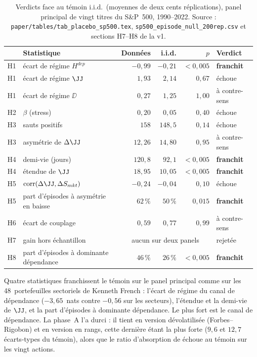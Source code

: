 \begin{table}[htbp]
\centering
\small
\begin{tabular}{@{}llrrrl@{}}
\toprule
& Statistique & Données & i.i.d. & $p$ & Verdict \\
\midrule
H1 & écart de régime $H^{dep}$ & $-0{,}99$ & $-0{,}21$ & $<0{,}005$ & \textbf{franchit} \\
H1 & écart de régime $\JJ$ & $1{,}93$ & $2{,}14$ & $0{,}67$ & échoue \\
H1 & écart de régime $\DD$ & $0{,}27$ & $1{,}25$ & $1{,}00$ & à contre-sens \\
H2 & $\beta$ (stress) & $0{,}20$ & $0{,}05$ & $0{,}40$ & échoue \\
H3 & sauts positifs & $158$ & $148{,}5$ & $0{,}14$ & échoue \\
H3 & asymétrie de $\Delta\JJ$ & $12{,}26$ & $14{,}80$ & $0{,}95$ & à contre-sens \\
H4 & demi-vie (jours) & $120{,}8$ & $92{,}1$ & $<0{,}005$ & \textbf{franchit} \\
H4 & étendue de $\JJ$ & $18{,}95$ & $10{,}05$ & $<0{,}005$ & \textbf{franchit} \\
H5 & $\mathrm{corr}(\Delta\JJ,\Delta S_{mkt})$ & $-0{,}24$ & $-0{,}04$ & $0{,}10$ & échoue \\
H5 & part d'épisodes à asymétrie en baisse & $62\,\%$ & $50\,\%$ & $0{,}015$ & \textbf{franchit} \\
H6 & écart de couplage & $0{,}59$ & $0{,}77$ & $0{,}99$ & à contre-sens \\
H7 & gain hors échantillon & \multicolumn{3}{c}{aucun sur deux panels} & rejetée \\
H8 & part d'épisodes à dominante dépendance & $46\,\%$ & $26\,\%$ & $<0{,}005$ & \textbf{franchit} \\
\bottomrule
\end{tabular}
\caption{Verdicts face au témoin i.i.d.\ (moyennes de deux cents réplications),
panel principal de vingt titres du S\&P~500, 1990--2022. Source :
\texttt{paper/tables/tab\_placebo\_sp500.tex}, \texttt{sp500\_episode\_null\_200rep.csv}
et sections H7--H8 de la v1.}
\label{tab:program}
\end{table}

Quatre statistiques franchissent le témoin sur le panel principal comme sur
les 48~portefeuilles sectoriels de Kenneth French : l'écart de régime du canal
de dépendance ($-3{,}65$~nats contre $-0{,}56$ sur les secteurs), l'étendue et
la demi-vie de $\JJ$, et la part d'épisodes à dominante dépendance. Le plus fort
est le canal de dépendance. La phase~A l'a durci : il tient en version
dévolatilisée (Forbes--Rigobon) et en version en rangs, cette dernière étant la
plus forte ($9{,}6$ et $12{,}7$ écarts-types du témoin), alors que le ratio
d'absorption de \citet{kritzman2011} échoue au témoin sur les vingt actions.

